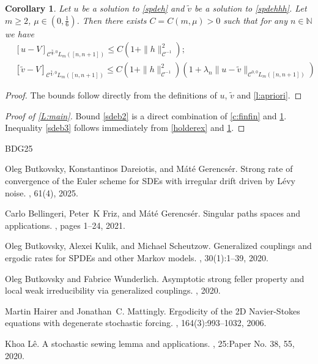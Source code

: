 \documentclass[12pt]{article}
\newtheorem{corollary}[theorem]{Corollary}
\theoremstyle{definition}
\DeclareMathOperator{\1}{\mathbbm{1}}%
\renewcommand{\ge}{\geqslant}
\renewcommand{\le}{\leqslant}
\newcommand{\wt}{\widetilde}
\newcommand{\C}{\mathcal{C}}
\newcommand{\N}{\mathbb{N}}
\begin{document}
\begin{corollary}\label{c:hmain}
Let $u$ be a solution to \eqref{spdeh} and $\wt v$ be a solution to 
\eqref{spdehhh}. Let $m\ge2$, $\mu\in(0,\frac16)$. Then there exists 
$C=C(m,\mu)>0$ such that for any $n\in\N$ we have 
\begin{align*}
&[u-V]_{\C^{\frac34,0}L_m([n,n+1])}\le  C (1+\|h\|_{\C^{-1}}^2);\\
&[\wt v-V]_{\C^{\frac34,0}L_m([n,n+1])}\le  C (1+\|h\|_{\C^{-1}}^2)(1+\lambda_n\|u-\wt v\|_{\C^{0,0} L_m([n,n+1])})
\end{align*}

 
\end{corollary}
\begin{proof}
The bounds follow directly from the definitions of $u$, $\wt v$ and \cref{l:apriori}. 
\end{proof}
\begin{proof}[Proof of \cref{L:main}] 
Bound \eqref{sdeb2} is a direct combination of \cref{c:finfin} and \cref{c:hmain}.	
Inequality \eqref{sdeb3} follows immediately from \eqref{holderex} and \cref{c:hmain}. 
\end{proof}


\begin{thebibliography}{BDG25}

Oleg Butkovsky, Konstantinos Dareiotis, and M\'at\'e Gerencs\'er.
\newblock Strong rate of convergence of the {E}uler scheme for {SDE}s with
  irregular drift driven by {L}\'evy noise.
, 61(4), 2025.

Carlo Bellingeri, Peter~K Friz, and M{\'a}t{\'e} Gerencs{\'e}r.
\newblock Singular paths spaces and applications.
, pages 1--24, 2021.

Oleg Butkovsky, Alexei Kulik, and Michael Scheutzow.
\newblock Generalized couplings and ergodic rates for {SPDE}s and other
  {M}arkov models.
, 30(1):1--39, 2020.

Oleg Butkovsky and Fabrice Wunderlich.
\newblock Asymptotic strong feller property and local weak irreducibility via
  generalized couplings.
, 2020.

Martin Hairer and Jonathan~C. Mattingly.
\newblock Ergodicity of the 2{D} {N}avier-{S}tokes equations with degenerate
  stochastic forcing.
, 164(3):993--1032, 2006.

Khoa L{\^e}.
\newblock A stochastic sewing lemma and applications.
, 25:Paper No. 38, 55, 2020.

\end{thebibliography}
\end{document}
